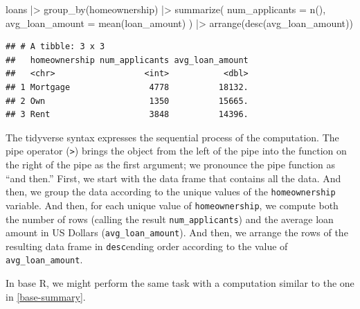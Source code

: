 \documentclass[12pt]{article}
\newenvironment{Shaded}{\begin{snugshade}}{\end{snugshade}}
\newcommand{\AttributeTok}[1]{\textcolor[rgb]{0.77,0.63,0.00}{#1}}
\newcommand{\FunctionTok}[1]{\textcolor[rgb]{0.00,0.00,0.00}{#1}}
\newcommand{\NormalTok}[1]{#1}
\newcommand{\SpecialCharTok}[1]{\textcolor[rgb]{0.00,0.00,0.00}{#1}}
\begin{document}
\begin{Shaded}
\begin{Highlighting}[]
\NormalTok{loans }\SpecialCharTok{|\textgreater{}}
  \FunctionTok{group\_by}\NormalTok{(homeownership) }\SpecialCharTok{|\textgreater{}}
  \FunctionTok{summarize}\NormalTok{(}
    \AttributeTok{num\_applicants =} \FunctionTok{n}\NormalTok{(),}
    \AttributeTok{avg\_loan\_amount =} \FunctionTok{mean}\NormalTok{(loan\_amount)}
\NormalTok{  ) }\SpecialCharTok{|\textgreater{}}
  \FunctionTok{arrange}\NormalTok{(}\FunctionTok{desc}\NormalTok{(avg\_loan\_amount))}
\end{Highlighting}
\end{Shaded}

\begin{verbatim}
## # A tibble: 3 x 3
##   homeownership num_applicants avg_loan_amount
##   <chr>                  <int>           <dbl>
## 1 Mortgage                4778          18132.
## 2 Own                     1350          15665.
## 3 Rent                    3848          14396.
\end{verbatim}


\label{tidy-summary} \linespread{2}
\vspace{3mm}\setlength{\parindent}{15pt}

The tidyverse syntax expresses the sequential process of the
computation. The pipe operator (\texttt{\textbar{}\textgreater{}})
brings the object from the left of the pipe into the function on the
right of the pipe as the first argument; we pronounce the pipe function
as ``and then.'' First, we start with the data frame that contains all
the data. And then, we group the data according to the unique values of
the \texttt{homeownership} variable. And then, for each unique value of
\texttt{homeownership}, we compute both the number of rows (calling the
result \texttt{num\_applicants}) and the average loan amount in US
Dollars (\texttt{avg\_loan\_amount}). And then, we arrange the rows of
the resulting data frame in \texttt{desc}ending order according to the
value of \texttt{avg\_loan\_amount}.

In base R, we might perform the same task with a computation similar to
the one in \ref{base-summary}.

\linespread{1}
\end{document}
